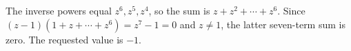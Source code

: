 The inverse powers equal $ z^6,z^5,z^4 $, so the sum is $ z+z^2+\cdots+z^6 $. Since $(z-1)(1+z+\cdots+z^6)=z^7-1=0 $ and $ z\ne1 $, the latter seven-term sum is zero. The requested value is $\boxed{-1}$.
